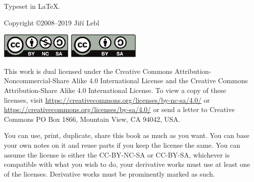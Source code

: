 \documentclass[12pt]{book}
\begin{document}

\newcommand{\theversion}{6.0 draft}
\makediffytitlepage

\pagebreak

\vspace*{\fill}

\noindent
Typeset in \LaTeX.

\bigskip

\noindent
Copyright \copyright 2008--2019 Ji\v{r}\'i Lebl



\bigskip

\noindent
\includegraphics[width=1.38in]{figures/license}
\quad
\includegraphics[width=1.38in]{figures/license2}

\bigskip

\noindent
This work
is dual licensed under
the Creative Commons
Attribution-Non\-commercial-Share Alike 4.0 International License and
the Creative Commons
Attribution-Share Alike 4.0 International License.
To view a
copy of these licenses, visit
\url{https://creativecommons.org/licenses/by-nc-sa/4.0/}
or
\url{https://creativecommons.org/licenses/by-sa/4.0/}
or send a letter to
Creative Commons
PO Box 1866, Mountain View, CA 94042, USA\@.

\bigskip

\noindent
You can use, print, duplicate, share this book as much as you want.  You can
base your own notes on it and reuse parts if you keep the license the
same.  You can assume the license is either the
CC-BY-NC-SA or CC-BY-SA\@,
whichever is compatible with what you wish to do, your derivative works must
use at least one of the licenses.
Derivative works must be prominently marked as such.
\end{document}
